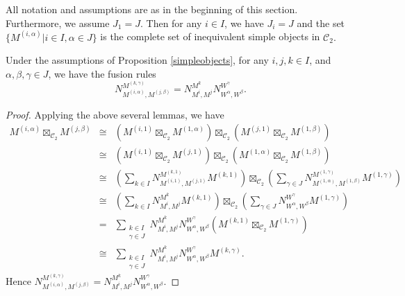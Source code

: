 \documentclass[10pt,a4paper]{amsart}
\def\CC{{\mathcal{C}}}
\begin{document}
\begin{proposition}\label{simpleobjects}
	All notation and assumptions are as in the beginning of this section. Furthermore, we assume $J_1=J$. Then for any $i\in I$, we have $J_i=J$ and the set $\{M^{(i,\alpha)}| i\in I, \alpha\in J\}$ is the complete set of inequivalent simple objects in $\CC_2.$
\end{proposition}

\begin{theorem}\label{fusionrule1}
	Under the assumptions of Proposition \ref{simpleobjects},  for any $i, j, k \in I$, and $\alpha, \beta, \gamma \in J$, we have the fusion rules $$N_{M^{(i,\alpha)},M^{(j,\beta)}}^{M^{(k,\gamma)}}=N_{M^i,M^j}^{M^k} N_{W^{\alpha},W^{\beta}}^{W^{\gamma}}.$$
\end{theorem}

\begin{proof}
	Applying the above several lemmas, we have
	\begin{eqnarray*}
		M^{(i,\alpha)}\boxtimes_{ \CC_2}M^{(j,\beta)} &\cong&(M^{(i,1)}\boxtimes_{ \CC_2}M^{(1,\alpha)})
		\boxtimes_{ \CC_2}(M^{(j,1)}\boxtimes_{ \CC_2}M^{(1,\beta)})\\
		&\cong&(M^{(i,1)}\boxtimes_{ \CC_2}M^{(j,1)})
		\boxtimes_{ \CC_2}(M^{(1,\alpha)}\boxtimes_{ \CC_2}M^{(1,\beta)})\\
		&\cong&\left(\sum_{k\in I}N_{ M^{(i,1)},M^{(j,1)}}^{M^{(k,1)}}M^{(k, 1)}\right)\boxtimes_{ \CC_2}
		\left(\sum_{\gamma\in J}N_{ M^{(1,\alpha)},M^{(1, \beta)}}^{M^{(1, \gamma)}}M^{(1,\gamma)}\right)\\
		&\cong&\left(\sum_{k\in I}N_{M^i,M^j}^{M^k}M^{(k, 1)}\right)\boxtimes_{ \CC_2}
		\left(\sum_{\gamma\in J}N_{W^{\alpha},W^{\beta}}^{W^{\gamma}}M^{(1,\gamma)}\right)\\
		& =&\sum_{\substack{k\in I \\ \gamma \in J}}N_{M^i,M^j}^{M^k} N_{W^{\alpha},W^{\beta}}^{W^{\gamma}}\left(M^{(k, 1)}\boxtimes_{ \CC_2}M^{(1,\gamma)}\right)\\
		&\cong&\sum_{\substack{k\in I \\ \gamma \in J}}N_{M^i,M^j}^{M^k} N_{W^{\alpha},W^{\beta}}^{W^{\gamma}}M^{(k,\gamma)}.
	\end{eqnarray*}
	Hence $N_{M^{(i,\alpha)},M^{(j,\beta)}}^{M^{(k,\gamma)}}=N_{M^i,M^j}^{M^k} N_{W^{\alpha},W^{\beta}}^{W^{\gamma}}.$
\end{proof}
\end{document}
